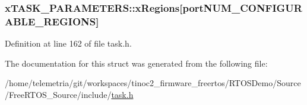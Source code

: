 \subsubsection[{\texorpdfstring{x\+Regions}{xRegions}}]{ x\+T\+A\+S\+K\+\_\+\+P\+A\+R\+A\+M\+E\+T\+E\+R\+S\+::x\+Regions\mbox{[}{\bf port\+N\+U\+M\+\_\+\+C\+O\+N\+F\+I\+G\+U\+R\+A\+B\+L\+E\+\_\+\+R\+E\+G\+I\+O\+NS}\mbox{]}}\hypertarget{structx_t_a_s_k___p_a_r_a_m_e_t_e_r_s_ae8b97c6b7a344bf09b066b0844844d66}{}\label{structx_t_a_s_k___p_a_r_a_m_e_t_e_r_s_ae8b97c6b7a344bf09b066b0844844d66}


Definition at line 162 of file task.\+h.



The documentation for this struct was generated from the following file\+:\begin{DoxyCompactItemize}
\item 
/home/telemetria/git/workspaces/tinoc2\+\_\+firmware\+\_\+freertos/\+R\+T\+O\+S\+Demo/\+Source/\+Free\+R\+T\+O\+S\+\_\+\+Source/include/\hyperlink{task_8h}{task.\+h}\end{DoxyCompactItemize}
